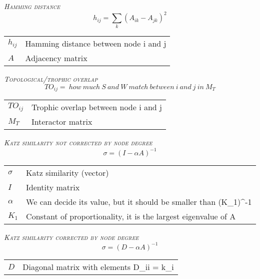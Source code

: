 \documentclass{article}
\makeatletter
\newenvironment{conditions}
  {\par\vspace{\abovedisplayskip}\noindent\begin{tabular}{>{$}l<{$} @{${}={}$} l}}
  {\end{tabular}\par\vspace{\belowdisplayskip}}
\makeatother
\begin{document}
	
\bigskip
\noindent \textrm{\textsc{\textsl{Hamming distance}}} 
\begin{equation}
	h_{ij}=\sum_k(A_{ik}-A_{jk})^2
        \label{eqn:hamming_distance}
\end{equation}
    \begin{conditions}
	    h_{ij} & Hamming distance between node i and j \\
        A & Adjacency matrix \\
	\end{conditions}
    
    
\bigskip
\noindent \textrm{\textsc{\textsl{Topological/trophic overlap}}} 
\begin{equation}
    TO_{ij}=\:how\:much\:S\:and\:W\:match\:between\:i\:and\:j\:in\:M_T
        \label{eqn:topological_overlap}
\end{equation}
    \begin{conditions}
        TO_{ij} & Trophic overlap between node i and j \\
        M_T & Interactor matrix
    \end{conditions}


\bigskip
\noindent \textrm{\textsc{\textsl{Katz similarity not corrected by node degree}}} 
\begin{equation}
    \sigma = (I-\alpha A)^{-1}
        \label{eqn:katz_similarity}
\end{equation}
	\begin{conditions}
			\sigma & Katz similarity (vector) \\
			I & Identity matrix \\
			\alpha & We can decide its value, but it should be smaller than (K_1)^{-1} \\
			K_1 & Constant of proportionality, it is the largest eigenvalue of A \\
	\end{conditions}
	
	
\bigskip
\noindent \textrm{\textsc{\textsl{Katz similarity corrected by node degree}}} 
\begin{equation}
	\sigma = (D - \alpha A)^{-1}
    	\label{eqn:katz_similarity_corrected}
\end{equation}
	\begin{conditions}
        D & Diagonal matrix with elements D_{ii} = k_i \\
	\end{conditions}
	
\end{document}
